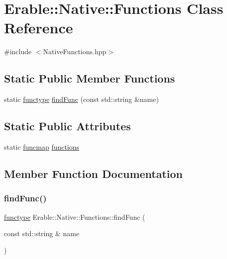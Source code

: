 \hypertarget{class_erable_1_1_native_1_1_functions}{}\section{Erable\+::Native\+::Functions Class Reference}
\label{class_erable_1_1_native_1_1_functions}


{\ttfamily \#include $<$Native\+Functions.\+hpp$>$}

\subsection*{Static Public Member Functions}
\begin{DoxyCompactItemize}
\item 
static \mbox{\hyperlink{namespace_erable_1_1_native_ad05719f34b3261ec6ed5ae50fdc188a5}{functype}} \mbox{\hyperlink{class_erable_1_1_native_1_1_functions_a015885fd7f1e5f93b2abf9eea8526f6a}{find\+Func}} (const std\+::string \&name)
\end{DoxyCompactItemize}
\subsection*{Static Public Attributes}
\begin{DoxyCompactItemize}
\item 
static \mbox{\hyperlink{namespace_erable_1_1_native_a6b24cdc21d4331b17b20ec0d3ed9e851}{funcmap}} \mbox{\hyperlink{class_erable_1_1_native_1_1_functions_abf72e0b257bbaea52491a7185915596f}{functions}}
\end{DoxyCompactItemize}


\subsection{Member Function Documentation}
\mbox{\label{class_erable_1_1_native_1_1_functions_a015885fd7f1e5f93b2abf9eea8526f6a}} 
\subsubsection{\texorpdfstring{findFunc()}{findFunc()}}
{\footnotesize\ttfamily \mbox{\hyperlink{namespace_erable_1_1_native_ad05719f34b3261ec6ed5ae50fdc188a5}{functype}} Erable\+::\+Native\+::\+Functions\+::find\+Func (\begin{DoxyParamCaption}\item[{const std\+::string \&}]{name }\end{DoxyParamCaption})\hspace{0.3cm}{\ttfamily [static]}}



